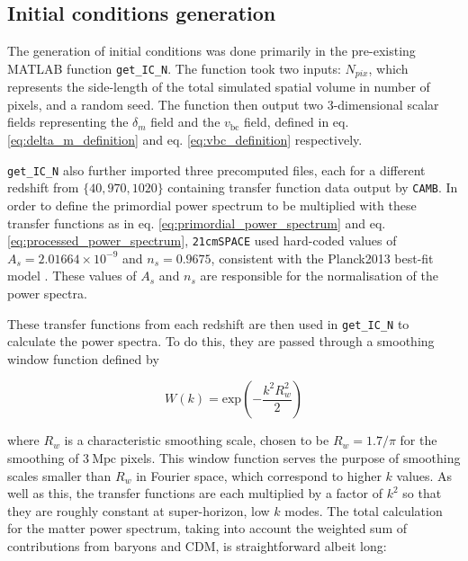 \documentclass[floats,floatfix,showpacs,amssymb,prd,superscriptaddress,nofootinbib, 11pt]{revtex4-2} %
\newcommand{\code}{\texttt}
\newcommand{\red}{\textcolor{red}}
\begin{document}



\subsection{Initial conditions generation}

The generation of initial conditions was done primarily in the pre-existing MATLAB function \code{get\_IC\_N}. The function took two inputs: $N_{pix}$, which represents the side-length of the total simulated spatial volume in number of pixels, and a random seed. The function then output two 3-dimensional scalar fields representing the $\delta_m$ field and the $v_{\text{bc}}$ field, defined in eq. \ref{eq:delta_m_definition} and eq. \ref{eq:vbc_definition} respectively.

\code{get\_IC\_N} also further imported three precomputed files, each for a different redshift from $\{40, 970, 1020\}$ containing transfer function data output by \code{CAMB}. In order to define the primordial power spectrum to be multiplied with these transfer functions as in eq. \ref{eq:primordial_power_spectrum} and eq. \ref{eq:processed_power_spectrum}, \code{21cmSPACE} used hard-coded values of $A_s = 2.01664 \times 10^{-9}$ and $n_s = 0.9675$, consistent with the Planck2013 best-fit model \citep{Planck2013results}. These values of $A_s$ and $n_s$ are responsible for the normalisation of the power spectra.

These transfer functions from each redshift are then used in \code{get\_IC\_N} to calculate the power spectra. To do this, they are  passed through a smoothing window function defined by 

\begin{equation}
    W(k) = \text{exp}\left( -\frac{k^2 R_w ^2}{2} \right)
\end{equation}

\noindent where $R_w$ is a characteristic smoothing scale, chosen to be $R_w = 1.7 / \pi$ for the smoothing of $3 ~\text{Mpc}$ pixels. 
This window function serves the purpose of smoothing scales smaller than $R_w$ in Fourier space, which correspond to higher $k$ values. As well as this, the transfer functions are each multiplied by a factor of $k^2$ so that they are roughly constant at super-horizon, low $k$ modes. The total calculation for the matter power spectrum, taking into account the weighted sum of contributions from baryons and CDM, is straightforward albeit long:
\end{document}
